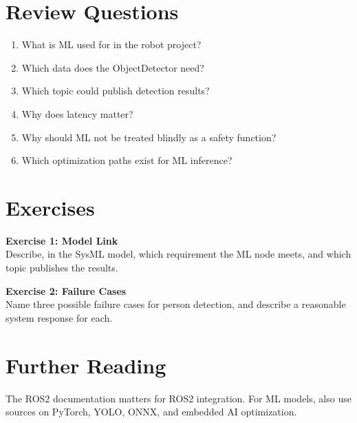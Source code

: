 \section{Review Questions}
\begin{enumerate}
    \item What is ML used for in the robot project?
    \item Which data does the ObjectDetector need?
    \item Which topic could publish detection results?
    \item Why does latency matter?
    \item Why should ML not be treated blindly as a safety function?
    \item Which optimization paths exist for ML inference?
\end{enumerate}

\section{Exercises}
\begin{uebungbox}
\textbf{Exercise 1: Model Link}\\
Describe, in the SysML model, which requirement the ML node meets, and which topic publishes the results.
\end{uebungbox}

\begin{uebungbox}
\textbf{Exercise 2: Failure Cases}\\
Name three possible failure cases for person detection, and describe a reasonable system response for each.
\end{uebungbox}

\section{Further Reading}
The ROS2 documentation \cite{ros2docs} matters for ROS2 integration. For ML models, also use sources on PyTorch, YOLO, ONNX, and embedded AI optimization.
